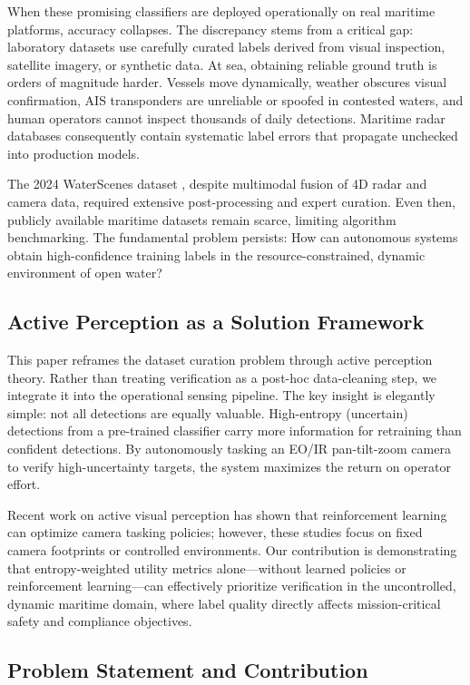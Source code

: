 \documentclass[conf]{asmeconf}
\begin{document}
When these promising classifiers are deployed operationally on real maritime platforms, accuracy collapses. The discrepancy stems from a critical gap: laboratory datasets use carefully curated labels derived from visual inspection, satellite imagery, or synthetic data. At sea, obtaining reliable ground truth is orders of magnitude harder. Vessels move dynamically, weather obscures visual confirmation, AIS transponders are unreliable or spoofed in contested waters, and human operators cannot inspect thousands of daily detections. Maritime radar databases consequently contain systematic label errors that propagate unchecked into production models.

The 2024 WaterScenes dataset \cite{Zhang2024WaterScenes}, despite multimodal fusion of 4D radar and camera data, required extensive post-processing and expert curation. Even then, publicly available maritime datasets remain scarce, limiting algorithm benchmarking. The fundamental problem persists: How can autonomous systems obtain high-confidence training labels in the resource-constrained, dynamic environment of open water?

\subsection{Active Perception as a Solution Framework}

This paper reframes the dataset curation problem through active perception theory. Rather than treating verification as a post-hoc data-cleaning step, we integrate it into the operational sensing pipeline. The key insight is elegantly simple: not all detections are equally valuable. High-entropy (uncertain) detections from a pre-trained classifier carry more information for retraining than confident detections. By autonomously tasking an EO/IR pan-tilt-zoom camera to verify high-uncertainty targets, the system maximizes the return on operator effort.

Recent work on active visual perception \cite{Yang2024PTZRL} has shown that reinforcement learning can optimize camera tasking policies; however, these studies focus on fixed camera footprints or controlled environments. Our contribution is demonstrating that entropy-weighted utility metrics alone---without learned policies or reinforcement learning---can effectively prioritize verification in the uncontrolled, dynamic maritime domain, where label quality directly affects mission-critical safety and compliance objectives.

\subsection{Problem Statement and Contribution}
\end{document}
